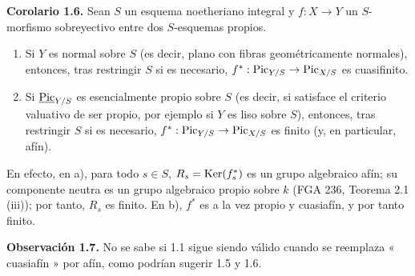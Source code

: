 \textbf{Corolario 1.6.} Sean \(S\) un esquema noetheriano integral y
\(f:X\to Y\) un \(S\)-morfismo sobreyectivo entre dos \(S\)-esquemas
propios.
\begin{enumerate}[label=\alph*)]
\item Si \(Y\) es normal sobre \(S\) (es decir, plano con fibras
geométricamente normales), entonces, tras restringir \(S\) si es necesario,
\(f^*:\operatorname{Pic}_{Y/S}\to\operatorname{Pic}_{X/S}\) es cuasifinito.
\item Si \(\underline{\operatorname{Pic}}_{Y/S}\) es esencialmente propio sobre \(S\) (es decir, si
satisface el criterio valuativo de ser propio, por ejemplo si \(Y\) es liso
sobre \(S\)), entonces, tras restringir \(S\) si es necesario,
\(f^*:\operatorname{Pic}_{Y/S}\to\operatorname{Pic}_{X/S}\) es finito (y, en particular, afín).
\end{enumerate}
En efecto, en a), para todo \(s\in S\), \(R_s=\operatorname{Ker}(f_s^*)\) es un grupo
algebraico afín; su componente neutra es un grupo algebraico propio sobre
\(k\) (FGA 236, Teorema 2.1 (iii)); por tanto, \(R_s\) es finito. En b),
\(f^*\) es a la vez propio y cuasiafín, y por tanto finito.

\textbf{Observación 1.7.} No se sabe si 1.1 sigue siendo válido cuando se
reemplaza « cuasiafín » por afín, como podrían sugerir 1.5 y 1.6.
